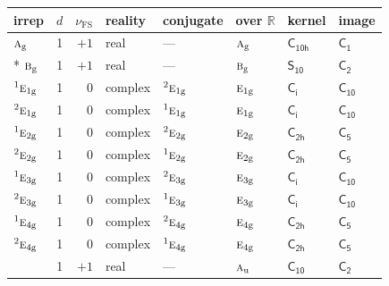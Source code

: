 \documentclass[10pt,a4paper]{article}
\numberwithin{equation}{section}
\newcommand{\grp}[1]{\mathsf{#1}}
\newcommand{\irr}[1]{\text{\normalfont\scshape #1}}
\newcommand{\conjpair}[1]{{}^{#1}}
\newcommand{\detbox}[1]{{\setlength{\fboxsep}{1pt}\fbox{#1}}}
\newcommand{\ptag}[1]{\mathrm{#1}}
\newcommand{\fsind}{\nu_{\mathrm{FS}}}
\begin{document}
{\small\renewcommand{\arraystretch}{1.25}\setlength{\tabcolsep}{4pt}\begin{longtable}{@{}lrrlllll@{}}\toprule
irrep & $d$ & $\fsind$ & reality & conjugate & over $\mathbb{R}$ & kernel & image\\\midrule\endhead
\bottomrule\endfoot\endlastfoot
$\irr{a}_{\ptag{g}}$ & 1 & $+1$ & real & --- & $\irr{a}_{\ptag{g}}$ & \href{C10h.pdf}{$\grp{C_{10h}}$} & \href{C1.pdf}{$\grp{C_{1}}$}\\*
$\irr{b}_{\ptag{g}}$ & 1 & $+1$ & real & --- & $\irr{b}_{\ptag{g}}$ & \href{S10.pdf}{$\grp{S_{10}}$} & \href{C2.pdf}{$\grp{C_{2}}$}\\
$\conjpair{1}\irr{e}_{1\ptag{g}}$ & 1 & $0$ & complex & $\conjpair{2}\irr{e}_{1\ptag{g}}$ & $\irr{e}_{1\ptag{g}}$ & \href{S2.pdf}{$\grp{C_{i}}$} & \href{C10.pdf}{$\grp{C_{10}}$}\\
$\conjpair{2}\irr{e}_{1\ptag{g}}$ & 1 & $0$ & complex & $\conjpair{1}\irr{e}_{1\ptag{g}}$ & $\irr{e}_{1\ptag{g}}$ & \href{S2.pdf}{$\grp{C_{i}}$} & \href{C10.pdf}{$\grp{C_{10}}$}\\
$\conjpair{1}\irr{e}_{2\ptag{g}}$ & 1 & $0$ & complex & $\conjpair{2}\irr{e}_{2\ptag{g}}$ & $\irr{e}_{2\ptag{g}}$ & \href{C2h.pdf}{$\grp{C_{2h}}$} & \href{C5.pdf}{$\grp{C_{5}}$}\\
$\conjpair{2}\irr{e}_{2\ptag{g}}$ & 1 & $0$ & complex & $\conjpair{1}\irr{e}_{2\ptag{g}}$ & $\irr{e}_{2\ptag{g}}$ & \href{C2h.pdf}{$\grp{C_{2h}}$} & \href{C5.pdf}{$\grp{C_{5}}$}\\
$\conjpair{1}\irr{e}_{3\ptag{g}}$ & 1 & $0$ & complex & $\conjpair{2}\irr{e}_{3\ptag{g}}$ & $\irr{e}_{3\ptag{g}}$ & \href{S2.pdf}{$\grp{C_{i}}$} & \href{C10.pdf}{$\grp{C_{10}}$}\\
$\conjpair{2}\irr{e}_{3\ptag{g}}$ & 1 & $0$ & complex & $\conjpair{1}\irr{e}_{3\ptag{g}}$ & $\irr{e}_{3\ptag{g}}$ & \href{S2.pdf}{$\grp{C_{i}}$} & \href{C10.pdf}{$\grp{C_{10}}$}\\
$\conjpair{1}\irr{e}_{4\ptag{g}}$ & 1 & $0$ & complex & $\conjpair{2}\irr{e}_{4\ptag{g}}$ & $\irr{e}_{4\ptag{g}}$ & \href{C2h.pdf}{$\grp{C_{2h}}$} & \href{C5.pdf}{$\grp{C_{5}}$}\\
$\conjpair{2}\irr{e}_{4\ptag{g}}$ & 1 & $0$ & complex & $\conjpair{1}\irr{e}_{4\ptag{g}}$ & $\irr{e}_{4\ptag{g}}$ & \href{C2h.pdf}{$\grp{C_{2h}}$} & \href{C5.pdf}{$\grp{C_{5}}$}\\
\detbox{$\irr{a}_{\ptag{u}}$} & 1 & $+1$ & real & --- & $\irr{a}_{\ptag{u}}$ & \href{C10.pdf}{$\grp{C_{10}}$} & \href{C2.pdf}{$\grp{C_{2}}$}\\

\end{longtable}}
\end{document}
